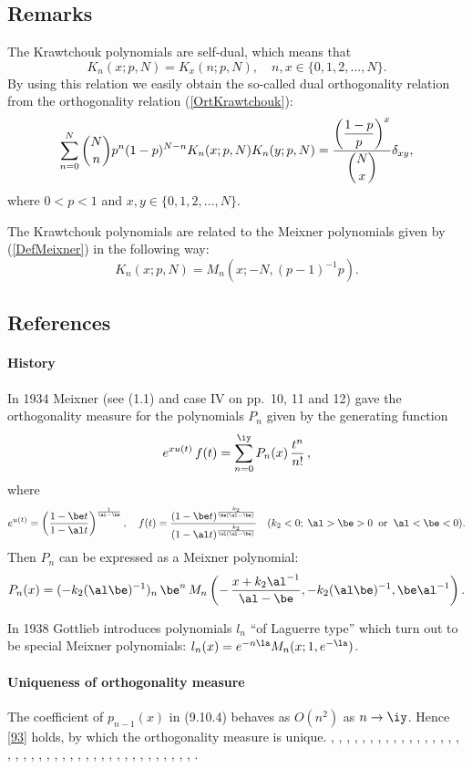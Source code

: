 \documentclass[envcountchap,graybox]{svmono}
\newcounter{rom}
\begin{document}
\subsection*{Remarks}
The Krawtchouk polynomials are self-dual, which means that
$$K_n(x;p,N)=K_x(n;p,N),\quad n,x\in\{0,1,2,\ldots,N\}.$$
By using this relation we easily obtain the so-called dual orthogonality
relation from the orthogonality relation (\ref{OrtKrawtchouk}):
$$\sum_{n=0}^N\binom{N}{n}p^n(1-p)^{N-n} K_n(x;p,N)K_n(y;p,N)=
\frac{\displaystyle\left(\frac{1-p}{p}\right)^x}{\dbinom{N}{x}}\delta_{xy},$$
where $0 < p < 1$ and $x,y\in\{0,1,2,\ldots,N\}$.

\noindent
The Krawtchouk polynomials are related to the Meixner polynomials given by (\ref{DefMeixner})
in the following way:
$$K_n(x;p,N)=M_n(x;-N,(p-1)^{-1}p).$$

\subsection*{References}
\label{sec9.10}
\paragraph{History}
In 1934 Meixner  (see
(1.1) and case IV on pp.~10, 11 and 12) gave the orthogonality
measure for the polynomials $P_n$ given by the generating function
\[
e^{x u(t)}\,f(t)=\sum_{n=0}^\iy P_n(x)\,\frac{t^n}{n!}\,,
\]
where
\[
e^{u(t)}=\left(\frac{1-\be t}{1-\al t}\right)^{\frac1{\al-\be}},\quad
f(t)=\frac{(1-\be t)^{\frac{k_2}{\be(\al-\be)}}}{(1-\al t)^{\frac{k_2}{\al(\al-\be)}}}\quad
(k_2<0;\;\al>\be>0\;\;{\rm or}\;\;\al<\be<0).
\]
Then $P_n$ can be expressed as a Meixner polynomial:
\[
P_n(x)=(-k_2(\al\be)^{-1})_n\,\be^n\,
M_n\left(-\,\frac{x+k_2\al^{-1}}{\al-\be},-k_2(\al\be)^{-1},\be\al^{-1}\right).
\]

In 1938 Gottlieb \cite[\S2]{K1} introduces polynomials $l_n$ ``of Laguerre type''
which turn out to be special Meixner polynomials:
$l_n(x)=e^{-n\la} M_n(x;1,e^{-\la})$.
%
\paragraph{Uniqueness of orthogonality measure}
The coefficient of $p_{n-1}(x)$ in (9.10.4) behaves as $O(n^2)$ as $n\to\iy$.
Hence \eqref{93} holds, by which the orthogonality measure is unique.
%
\cite{AlSalam90}, \cite{AndrewsAskey85}, \cite{Area+II}, \cite{Askey75}, \cite{Askey89I},
\cite{AskeyGasper77}, \cite{AskeyWilson85}, \cite{AtakRahmanSuslov}, \cite{Campigotto+},
\cite{LChiharaStanton}, \cite{Chihara78}, \cite{Dette95}, \cite{Dominici}, \cite{Dunkl76},
\cite{Dunkl84}, \cite{DunklRamirez}, \cite{Erdelyi+}, \cite{FeinsilverSchott},
\cite{Gasper73I}, \cite{Gasper74}, \cite{HoareRahman}, \cite{Ismail2005II}, \cite{Karlin58},
\cite{Koorn82}, \cite{Koorn88}, \cite{LabelleYehI}, \cite{LabelleYehII}, \cite{Lesky62},
\cite{Lesky89}, \cite{Lesky94I}, \cite{Lesky95II}, \cite{LewanowiczII}, \cite{Nikiforov+},
\cite{NikiforovUvarov}, \cite{Qiu}, \cite{Rahman78I}, \cite{Rahman79}, \cite{Stanton84},
\cite{Stanton90}, \cite{Szego75}, \cite{Zarzo+}, \cite{Zeng90}.
\end{document}
